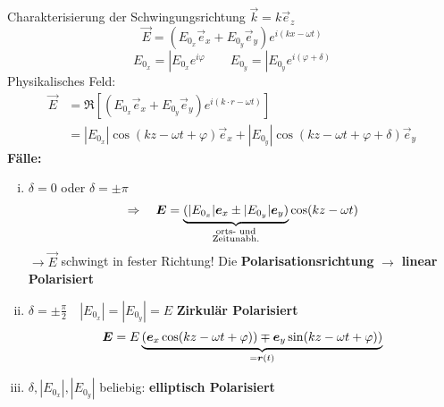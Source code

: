Charakterisierung der Schwingungsrichtung $ \vec{k} = k \vec{e}_z $
\begin{equation*}
\vec{E} = (E_{0_x} \vec{e}_x + E_{0_y} \vec{e}_y) e^{i(kx - \omega t)}
\end{equation*}
\begin{equation*}
E_{0_x} = |E_{0_x} e^{i \varphi} \qquad E_{0_y} = |E_{0_y} e^{i (\varphi + \delta)}
\end{equation*}
Physikalisches Feld:
\begin{align*}
\vec{E} &= \Re \left[ (E_{0_x} \vec{e}_x + E_{0_y} \vec{e}_y) e^{i(k \cdot r - \omega t)} \right]\\
&= |E_{0_x}| \cos(kz - \omega t + \varphi) \vec{e}_x + |E_{0_y}| \cos(kz - \omega t + \varphi + \delta) \vec{e}_y
\end{align*}
\textbf{Fälle:}\\
\begin{enumerate}[i)]
	\item
	$ \delta = 0 $ oder $ \delta = \pm \pi $
	\begin{equation*}
	\Rightarrow \quad \vec{E} = \ub{(|E_{0_x}| \vec{e}_x \pm |E_{0_y}| \vec{e}_y)}_{\mathclap{\substack{\tx{orts- und} \\ \tx{Zeitunabh.}}}} \cos(kz - \omega t)
	\end{equation*}
	$ \rightarrow \vec{E} $ schwingt in fester Richtung! Die \textbf{Polarisationsrichtung}
	$ \rightarrow $ \textbf{linear Polarisiert}
	\item
	$ \delta = \pm \frac{\pi}{2} \quad |E_{0_x}| = |E_{0_y}| = E $
	\textbf{Zirkulär Polarisiert}
	\begin{align*}
	\bm{E} = E\underbrace{(\bm{e}_x \cos(kz - \omega t + \varphi)) \mp \bm{e}_y \sin(kz - \omega t + \varphi))}_{ = \bm{r} (t)}
	\end{align*}
	\item
	$ \delta , |E_{0_x}|, |E_{0_y}| $ beliebig:
	\textbf{elliptisch Polarisiert}
\end{enumerate}
